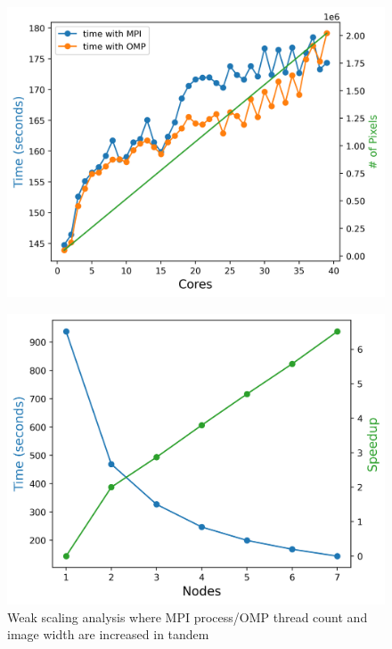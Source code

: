 \begin{figure}[h]
  \centering
 \begin{minipage}{0.45\linewidth}
  \includegraphics[width=\linewidth]{figs/mpi_weak2.out}
 \caption{Weak scaling analysis where MPI process/OMP thread count and image width are increased in tandem }
    \label{fig:mpi_weak2}
    \end{minipage}
  \hspace{.05\linewidth}
  \begin{minipage}{0.45\linewidth}
      \includegraphics[width=\linewidth]{figs/mpi_strong_multinode.out}

\end{minipage}
\end{figure}
